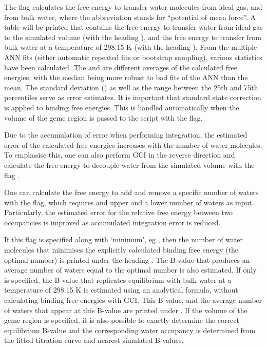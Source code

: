 \documentclass[letterpaper,10pt,english]{sphinxmanual}
\begin{document}
The flag  calculates the free energy to transfer water molecules from ideal gas, and from bulk water, where the abbreviation stands for “potential of mean force”. A table will be printed that contains the free energy to transfer water from ideal gas to the simulated volume (with the heading ), and the free energy to transfer from bulk water at a temperature of 298.15 K (with the heading ). From the multiple ANN fits (either automatic repeated fits or bootstrap sampling), various statistics have been calculated. The  and  are different averages of the calculated free energies, with the median being more robust to bad fits of the ANN than the mean. The standard deviation () as well as the range between the 25th and 75th percentiles serve as error estimates. It is important that standard state correction is applied to binding free energies. This is handled automatically when the volume of the gcmc region is passed to the script with the  flag.

Due to the accumulation of error when performing integration, the estimated error of the calculated free energies increases with the number of water molecules. To emphasise this, one can also perform GCI in the reverse direction and calculate the free energy to decouple water from the simulated volume with the flag .

One can calculate the free energy to add and remove a specific number of waters with the  flag, which requires and upper and a lower number of waters as input. Particularly, the estimated error for the relative free energy between two occupancies is improved as accumulated integration error is reduced.

If this flag is specified along with ‘minimum’, eg , then the number of water molecules that minimises the explicitly calculated binding free energy (the optimal number) is printed under the heading . The B-value that produces an average number of waters equal to the optimal number is also estimated. If only  is specified, the B-value that replicates equilibrium with bulk water at a temperature of 298.15 K is estimated using an analytical formula, without calculating binding free energies with GCI. This B-value, and the average number of waters that appear at this B-value are printed under . If the volume of the gcmc region is specified, it is also possible to exactly determine the correct equilibrium B-value and the corresponding water occupancy is determined from the fitted titration curve and nearest simulated B-values.
\end{document}

